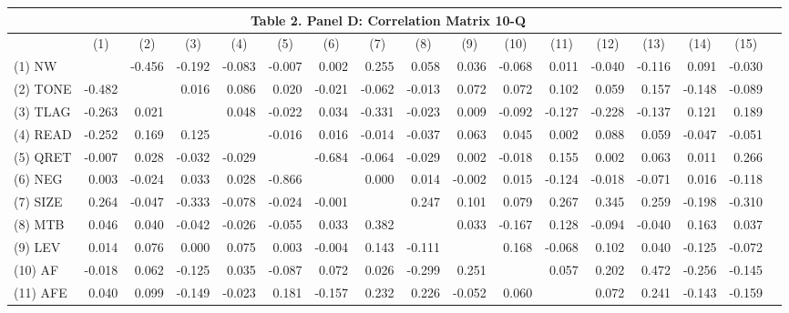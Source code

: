 \begin{table}[H] \label{T2PD}
  \centering
    \begin{tabular}{lrrrrrrrrrrrrrrrr}
    \multicolumn{16}{c}{\textbf{Table 2. Panel D: Correlation Matrix 10-Q}} \\
    \midrule
    \midrule
      & \multicolumn{1}{c}{(1)} & \multicolumn{1}{c}{(2)} & \multicolumn{1}{c}{(3)} & \multicolumn{1}{c}{(4)} & \multicolumn{1}{c}{(5)} & \multicolumn{1}{c}{(6)} & \multicolumn{1}{c}{(7)} & \multicolumn{1}{c}{(8)} & \multicolumn{1}{c}{(9)} & \multicolumn{1}{c}{(10)} & \multicolumn{1}{c}{(11)} & \multicolumn{1}{c}{(12)} & \multicolumn{1}{c}{(13)} & \multicolumn{1}{c}{(14)} & \multicolumn{1}{c}{(15)} \\
    \midrule
    (1) NW &  & -0.456 & -0.192 & -0.083 & -0.007 & 0.002 & 0.255 & 0.058 & 0.036 & -0.068 & 0.011 & -0.040 & -0.116 & 0.091 & -0.030 \\
    (2) TONE & -0.482 &  & 0.016 & 0.086 & 0.020 & -0.021 & -0.062 & -0.013 & 0.072 & 0.072 & 0.102 & 0.059 & 0.157 & -0.148 & -0.089 \\
    (3) TLAG & -0.263 & 0.021 &  & 0.048 & -0.022 & 0.034 & -0.331 & -0.023 & 0.009 & -0.092 & -0.127 & -0.228 & -0.137 & 0.121 & 0.189 \\
    (4) READ & -0.252 & 0.169 & 0.125 &  & -0.016 & 0.016 & -0.014 & -0.037 & 0.063 & 0.045 & 0.002 & 0.088 & 0.059 & -0.047 & -0.051 \\
    (5) QRET & -0.007 & 0.028 & -0.032 & -0.029 &  & -0.684 & -0.064 & -0.029 & 0.002 & -0.018 & 0.155 & 0.002 & 0.063 & 0.011 & 0.266 \\
    (6) NEG & 0.003 & -0.024 & 0.033 & 0.028 & -0.866 &  & 0.000 & 0.014 & -0.002 & 0.015 & -0.124 & -0.018 & -0.071 & 0.016 & -0.118 \\
    (7) SIZE & 0.264 & -0.047 & -0.333 & -0.078 & -0.024 & -0.001 &  & 0.247 & 0.101 & 0.079 & 0.267 & 0.345 & 0.259 & -0.198 & -0.310 \\
    (8) MTB & 0.046 & 0.040 & -0.042 & -0.026 & -0.055 & 0.033 & 0.382 &  & 0.033 & -0.167 & 0.128 & -0.094 & -0.040 & 0.163 & 0.037 \\
    (9) LEV & 0.014 & 0.076 & 0.000 & 0.075 & 0.003 & -0.004 & 0.143 & -0.111 &  & 0.168 & -0.068 & 0.102 & 0.040 & -0.125 & -0.072 \\
    (10) AF & -0.018 & 0.062 & -0.125 & 0.035 & -0.087 & 0.072 & 0.026 & -0.299 & 0.251 &  & 0.057 & 0.202 & 0.472 & -0.256 & -0.145 \\
    (11) AFE & 0.040 & 0.099 & -0.149 & -0.023 & 0.181 & -0.157 & 0.232 & 0.226 & -0.052 & 0.060 &  & 0.072 & 0.241 & -0.143 & -0.159 \\

\end{tabular}
\end{table}
